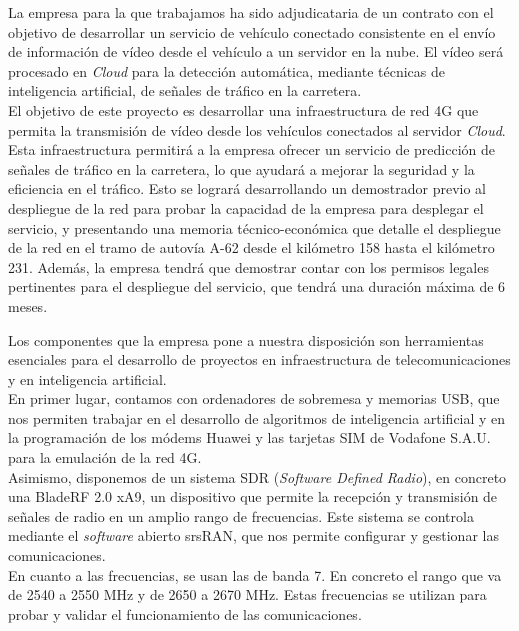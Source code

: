 
La empresa para la que trabajamos ha sido adjudicataria de un contrato con el objetivo de desarrollar un servicio de vehículo conectado consistente en el envío de información de vídeo desde el vehículo a un servidor en la nube. El vídeo será procesado en \textit{Cloud} para la detección automática, mediante técnicas de inteligencia artificial, de señales de tráfico en la carretera.\\

El objetivo de este proyecto es desarrollar una infraestructura de red 4G que permita la transmisión de vídeo desde los vehículos conectados al servidor \textit{Cloud}. Esta infraestructura permitirá a la empresa ofrecer un servicio de predicción de señales de tráfico en la carretera, lo que ayudará a mejorar la seguridad y la eficiencia en el tráfico. Esto se logrará desarrollando un demostrador previo al despliegue de la red para probar la capacidad de la empresa para desplegar el servicio, y presentando una memoria técnico-económica que detalle el despliegue de la red en el tramo de autovía A-62 desde el kilómetro 158 hasta el kilómetro 231. Además, la empresa tendrá que demostrar contar con los permisos legales pertinentes para el despliegue del servicio, que tendrá una duración máxima de 6 meses.

Los componentes que la empresa pone a nuestra disposición son herramientas esenciales para el desarrollo de proyectos en infraestructura de telecomunicaciones y en inteligencia artificial.\\

En primer lugar, contamos con ordenadores de sobremesa y memorias USB, que nos permiten trabajar en el desarrollo de algoritmos de inteligencia artificial y en la programación de los módems Huawei y las tarjetas SIM de Vodafone S.A.U. para la emulación de la red 4G.\\

Asimismo, disponemos de un sistema SDR (\textit{Software Defined Radio}), en concreto una BladeRF 2.0 xA9, un dispositivo que permite la recepción y transmisión de señales de radio en un amplio rango de frecuencias. Este sistema se controla mediante el \textit{software} abierto srsRAN, que nos permite configurar y gestionar las comunicaciones.\\

En cuanto a las frecuencias, se usan las de banda 7. En concreto el rango que va de 2540 a 2550 MHz y de 2650 a 2670 MHz. Estas frecuencias se utilizan para probar y validar el funcionamiento de las comunicaciones.\\

